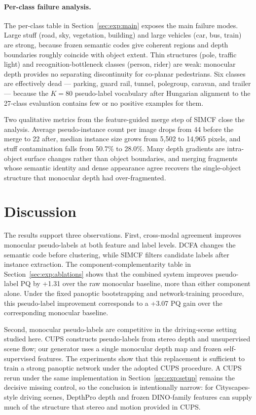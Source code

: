 \documentclass[10pt,twocolumn,letterpaper]{article}
\begin{document}
\paragraph{Per-class failure analysis.}
The per-class table in Section~\ref{sec:exp:main} exposes the main failure modes. Large stuff (road, sky, vegetation, building) and large vehicles (car, bus, train) are strong, because frozen semantic codes give coherent regions and depth boundaries roughly coincide with object extent. Thin structures (pole, traffic light) and recognition-bottleneck classes (person, rider) are weak: monocular depth provides no separating discontinuity for co-planar pedestrians. Six classes are effectively dead --- parking, guard rail, tunnel, polegroup, caravan, and trailer --- because the $K = 80$ pseudo-label vocabulary after Hungarian alignment to the 27-class evaluation contains few or no positive examples for them.

Two qualitative metrics from the feature-guided merge step of SIMCF close the analysis. Average pseudo-instance count per image drops from 44 before the merge to 22 after, median instance size grows from 5{,}502 to 14{,}965 pixels, and stuff contamination falls from 50.7\% to 28.0\%. Many depth gradients are intra-object surface changes rather than object boundaries, and merging fragments whose semantic identity and dense appearance agree recovers the single-object structure that monocular depth had over-fragmented.


\section{Discussion}
\label{sec:discussion}

The results support three observations. First, cross-modal agreement improves monocular pseudo-labels at both feature and label levels. DCFA changes the semantic code before clustering, while SIMCF filters candidate labels after instance extraction. The component-complementarity table in Section~\ref{sec:exp:ablations} shows that the combined system improves pseudo-label PQ by +1.31 over the raw monocular baseline, more than either component alone. Under the fixed panoptic bootstrapping and network-training procedure, this pseudo-label improvement corresponds to a +3.07 PQ gain over the corresponding monocular baseline.

Second, monocular pseudo-labels are competitive in the driving-scene setting studied here. CUPS constructs pseudo-labels from stereo depth and unsupervised scene flow; our generator uses a single monocular depth map and frozen self-supervised features. The experiments show that this replacement is sufficient to train a strong panoptic network under the adopted CUPS procedure. A CUPS rerun under the same implementation in Section~\ref{sec:exp:setup} remains the decisive missing control, so the conclusion is intentionally narrow: for Cityscapes-style driving scenes, DepthPro depth and frozen DINO-family features can supply much of the structure that stereo and motion provided in CUPS.
\end{document}

